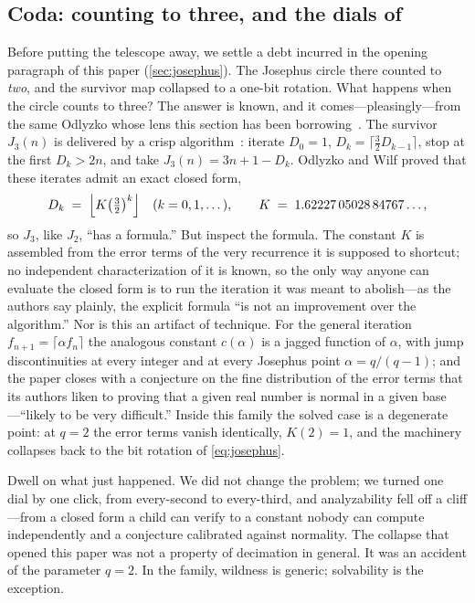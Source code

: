 \subsection{Coda: counting to three, and the dials of \SHA{}}
\label{sec:josephus3}

Before putting the telescope away, we settle a debt incurred in the
opening paragraph of this paper (\cref{sec:josephus}). The Josephus
circle there counted to \emph{two}, and the survivor map collapsed to a
one-bit rotation. What happens when the circle counts to three? The
answer is known, and it comes---pleasingly---from the same Odlyzko whose
lens this section has been borrowing~\citep{OdlyzkoWilf1991}. The
survivor $J_3(n)$ is delivered by a crisp algorithm~\citep[\S 3.3]{GKP1994}:
iterate $D_0 = 1$, $D_k = \bigl\lceil \tfrac{3}{2} D_{k-1} \bigr\rceil$,
stop at the first $D_k > 2n$, and take $J_3(n) = 3n + 1 - D_k$. Odlyzko
and Wilf proved that these iterates admit an exact closed form,
\[
  D_k \;=\; \Bigl\lfloor K \bigl(\tfrac{3}{2}\bigr)^{k} \Bigr\rfloor
  \quad (k = 0, 1, \dots), \qquad
  K \;=\; 1.62227\,05028\,84767\ldots,
\]
so $J_3$, like $J_2$, ``has a formula.'' But inspect the formula. The
constant $K$ is assembled from the error terms of the very recurrence it
is supposed to shortcut; no independent characterization of it is known,
so the only way anyone can evaluate the closed form is to run the
iteration it was meant to abolish---as the authors say plainly, the
explicit formula ``is not an improvement over the algorithm.'' Nor is
this an artifact of technique. For the general iteration
$f_{n+1} = \lceil \alpha f_n \rceil$ the analogous constant $c(\alpha)$
is a jagged function of $\alpha$, with jump discontinuities at every
integer and at every Josephus point $\alpha = q/(q-1)$; and the paper
closes with a conjecture on the fine distribution of the error terms
that its authors liken to proving that a given real number is normal in
a given base---``likely to be very difficult.'' Inside this family the
solved case is a degenerate point: at $q = 2$ the error terms vanish
identically, $K(2) = 1$, and the machinery collapses back to the bit
rotation of \cref{eq:josephus}.

Dwell on what just happened. We did not change the problem; we turned
one dial by one click, from every-second to every-third, and
analyzability fell off a cliff---from a closed form a child can verify
to a constant nobody can compute independently and a conjecture
calibrated against normality. The collapse that opened this paper was
not a property of decimation in general. It was an accident of the
parameter $q = 2$. In the family, wildness is generic; solvability is
the exception.

